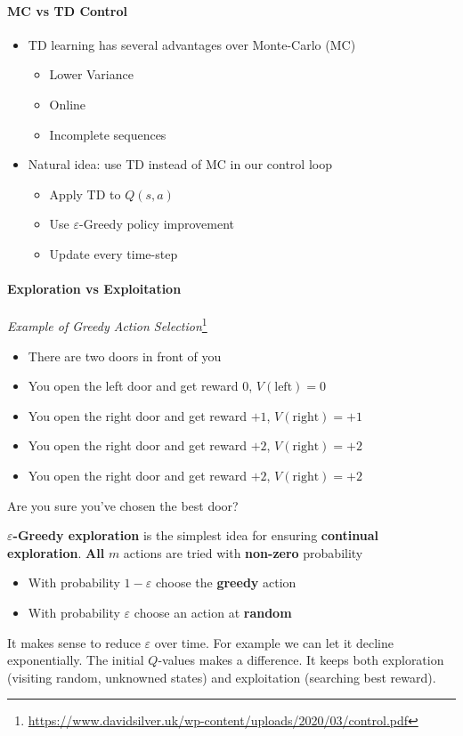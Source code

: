 \paragraph{MC vs TD Control}
\begin{itemize}
    \item TD learning has several advantages over Monte-Carlo (MC)
    \begin{itemize}
        \item Lower Variance
        \item Online
        \item Incomplete sequences
    \end{itemize}
    \item Natural idea: use TD instead of MC in our control loop
    \begin{itemize}
        \item Apply TD to $Q(s, a)$
        \item Use $\varepsilon$-Greedy policy improvement
        \item Update every time-step
    \end{itemize}
\end{itemize}

\paragraph{Exploration vs Exploitation}\leavevmode

\emph{Example of Greedy Action Selection}\footnote{\url{https://www.davidsilver.uk/wp-content/uploads/2020/03/control.pdf}}
\begin{itemize}
    \item There are two doors in front of you
    \item You open the left door and get reward 0, $V(\text{left})=0$
    \item You open the right door and get reward $+1$, $V(\text{right})=+1$
    \item You open the right door and get reward $+2$, $V(\text{right})=+2$
    \item You open the right door and get reward $+2$, $V(\text{right})=+2$
\end{itemize}
Are you sure you've chosen the best door?

\textbf{$\varepsilon$-Greedy exploration} is the simplest idea for ensuring \textbf{continual exploration}. \textbf{All} $m$ actions are tried with \textbf{non-zero} probability
\begin{itemize}
    \item With probability $1-\varepsilon$ choose the \textbf{greedy} action
    \item With probability $\varepsilon$ choose an action at \textbf{random}
\end{itemize}
It makes sense to reduce $\varepsilon$ over time. For example we can let it decline exponentially.
The initial $Q$-values makes a difference.
It keeps both exploration (visiting random, unknowned states) and exploitation (searching best reward).